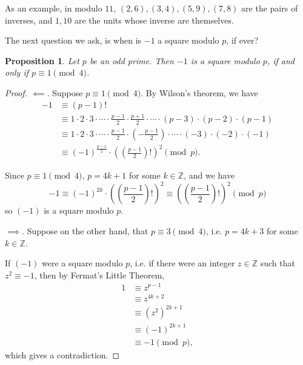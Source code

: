 \documentclass{article}
\newtheorem{proposition}[theorem]{Proposition}
\theoremstyle{definition}
\theoremstyle{remark}
\newcommand{\pqty}[1]{\left(#1\right)}
\newcommand{\ZZ}{\mathbb{Z}}
\begin{document}
As an example, in modulo \(11\), \(\pqty{2, 6}, \pqty{3, 4}, \pqty{5, 9}, \pqty{7, 8}\) are the pairs of inverses, and \(1, 10\) are the units whose inverse are themselves.

The next question we ask, is when is \(-1\) a square modulo \(p\), if ever?

\begin{proposition}
    Let \(p\) be an odd prime. Then \(-1\) is a square modulo \(p\), if and only if \(p \equiv 1 \pmod{4}\).
\end{proposition}

\begin{proof}
    \(\impliedby\). Suppose \(p \equiv 1 \pmod{4}\). By Wilson's theorem, we have
    \begin{align*}
        -1 &\equiv \pqty{p - 1}! \\
        &\equiv 1 \cdot 2 \cdot 3 \cdot \cdots \cdot \frac{p - 1}{2} \cdot \frac{p + 1}{2} \cdot \cdots \cdot \pqty{p - 3} \cdot \pqty{p - 2} \cdot \pqty{p - 1} \\
        &\equiv 1 \cdot 2 \cdot 3 \cdot \cdots \cdot \frac{p - 1}{2} \cdot \pqty{- \frac{p - 1}{2}} \cdot \cdots \cdot \pqty{-3} \cdot \pqty{-2} \cdot \pqty{-1} \\
        &\equiv \pqty{-1}^{\frac{p - 1}{2}} \cdot \pqty{\pqty{\frac{p - 1}{2}}!}^2 \pmod{p}.
    \end{align*}

    Since \(p \equiv 1 \pmod{4}\), \(p = 4k + 1\) for some \(k \in \ZZ\), and we have
    \[
        -1 \equiv \pqty{-1}^{2k} \cdot \pqty{\pqty{\frac{p - 1}{2}}!}^2 \equiv \pqty{\pqty{\frac{p - 1}{2}}!}^2 \pmod{p}
    \]
    so \(\pqty{-1}\) is a square modulo \(p\).

    \(\implies\). Suppose on the other hand, that \(p \equiv 3 \pmod{4}\), i.e. \(p = 4k + 3\) for some \(k \in \ZZ\).

    If \(\pqty{-1}\) were a square modulo \(p\), i.e. if there were an integer \(z \in \ZZ\) such that \(z^2 \equiv -1\), then by Fermat's Little Theorem,
    \begin{align*}
        1 &\equiv z^{p - 1} \\
        &\equiv z^{4k + 2} \\
        &\equiv \pqty{z^2}^{2k + 1} \\
        &\equiv \pqty{-1}^{2k + 1} \\
        &\equiv -1 \pmod{p},
    \end{align*}
    which gives a contradiction.
\end{proof}
\end{document}
